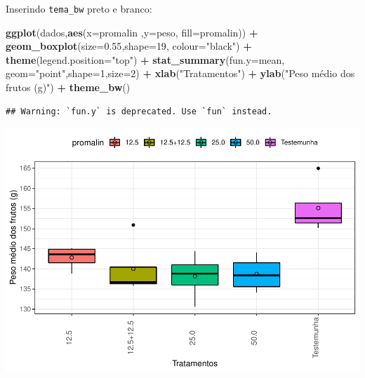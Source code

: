 \documentclass[
]{book}
\newenvironment{Shaded}{\begin{snugshade}}{\end{snugshade}}
\newcommand{\DataTypeTok}[1]{\textcolor[rgb]{0.13,0.29,0.53}{#1}}
\newcommand{\DecValTok}[1]{\textcolor[rgb]{0.00,0.00,0.81}{#1}}
\newcommand{\FloatTok}[1]{\textcolor[rgb]{0.00,0.00,0.81}{#1}}
\newcommand{\KeywordTok}[1]{\textcolor[rgb]{0.13,0.29,0.53}{\textbf{#1}}}
\newcommand{\NormalTok}[1]{#1}
\newcommand{\OperatorTok}[1]{\textcolor[rgb]{0.81,0.36,0.00}{\textbf{#1}}}
\newcommand{\StringTok}[1]{\textcolor[rgb]{0.31,0.60,0.02}{#1}}
\begin{document}
Inserindo \texttt{tema\_bw} preto e branco:

\begin{Shaded}
\begin{Highlighting}[]
\KeywordTok{ggplot}\NormalTok{(dados,}\KeywordTok{aes}\NormalTok{(}\DataTypeTok{x=}\NormalTok{promalin ,}\DataTypeTok{y=}\NormalTok{peso, }\DataTypeTok{fill=}\NormalTok{promalin)) }\OperatorTok{+}\StringTok{ }
\StringTok{      }\KeywordTok{geom_boxplot}\NormalTok{(}\DataTypeTok{size=}\FloatTok{0.55}\NormalTok{,}\DataTypeTok{shape=}\DecValTok{19}\NormalTok{, }\DataTypeTok{colour=}\StringTok{"black"}\NormalTok{) }\OperatorTok{+}\StringTok{ }
\StringTok{      }\KeywordTok{theme}\NormalTok{(}\DataTypeTok{legend.position=}\StringTok{"top"}\NormalTok{) }\OperatorTok{+}\StringTok{ }
\StringTok{      }\KeywordTok{stat_summary}\NormalTok{(}\DataTypeTok{fun.y=}\NormalTok{mean, }\DataTypeTok{geom=}\StringTok{"point"}\NormalTok{,}\DataTypeTok{shape=}\DecValTok{1}\NormalTok{,}\DataTypeTok{size=}\DecValTok{2}\NormalTok{) }\OperatorTok{+}\StringTok{ }
\StringTok{      }\KeywordTok{xlab}\NormalTok{(}\StringTok{"Tratamentos"}\NormalTok{) }\OperatorTok{+}\StringTok{  }
\StringTok{      }\KeywordTok{ylab}\NormalTok{(}\StringTok{"Peso médio dos frutos (g)"}\NormalTok{)  }\OperatorTok{+}
\StringTok{      }\KeywordTok{theme_bw}\NormalTok{() }
\end{Highlighting}
\end{Shaded}

\begin{verbatim}
## Warning: `fun.y` is deprecated. Use `fun` instead.
\end{verbatim}

\includegraphics{TudodoR_files/figure-latex/unnamed-chunk-239-1.pdf}
\end{document}
